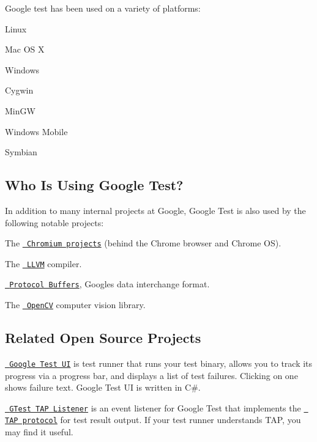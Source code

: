 Google test has been used on a variety of platforms\+:


\begin{DoxyItemize}
\item Linux
\item Mac OS X
\item Windows
\item Cygwin
\item Min\+GW
\item Windows Mobile
\item Symbian
\end{DoxyItemize}

\subsection*{Who Is Using Google Test?}

In addition to many internal projects at Google, Google Test is also used by the following notable projects\+:


\begin{DoxyItemize}
\item The \href{http://www.chromium.org/}\texttt{ Chromium projects} (behind the Chrome browser and Chrome OS).
\item The \href{http://llvm.org/}\texttt{ L\+L\+VM} compiler.
\item \href{https://github.com/google/protobuf}\texttt{ Protocol Buffers}, Google\textquotesingle{}s data interchange format.
\item The \href{http://opencv.org/}\texttt{ Open\+CV} computer vision library.
\end{DoxyItemize}

\subsection*{Related Open Source Projects}

\href{https://github.com/ospector/gtest-gbar}\texttt{ Google Test UI} is test runner that runs your test binary, allows you to track its progress via a progress bar, and displays a list of test failures. Clicking on one shows failure text. Google Test UI is written in C\#.

\href{https://github.com/kinow/gtest-tap-listener}\texttt{ G\+Test T\+AP Listener} is an event listener for Google Test that implements the \href{https://en.wikipedia.org/wiki/Test_Anything_Protocol}\texttt{ T\+AP protocol} for test result output. If your test runner understands T\+AP, you may find it useful.

